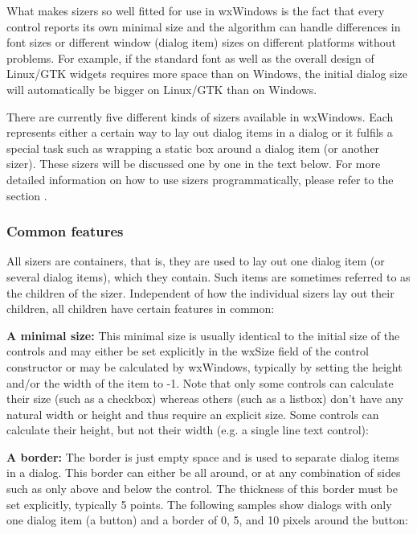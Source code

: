 What makes sizers so well fitted for use in wxWindows is the fact that every control
reports its own minimal size and the algorithm can handle differences in font sizes
or different window (dialog item) sizes on different platforms without problems. For example, if
the standard font as well as the overall design of Linux/GTK widgets requires more space than
on Windows, the initial dialog size will automatically be bigger on Linux/GTK than on Windows.

There are currently five different kinds of sizers available in wxWindows. Each represents
either a certain way to lay out dialog items in a dialog or it fulfils a special task
such as wrapping a static box around a dialog item (or another sizer). These sizers will
be discussed one by one in the text below. For more detailed information on how to use sizers
programmatically, please refer to the section .

\subsubsection{Common features}\label{sizerscommonfeatures}

All sizers are containers, that is, they are used to lay out one dialog item (or several
dialog items), which they contain. Such items are sometimes referred to as the children
of the sizer. Independent of how the individual sizers lay out their children, all children
have certain features in common:

{\bf A minimal size:} This minimal size is usually identical to
the initial size of the controls and may either be set explicitly in the wxSize field
of the control constructor or may be calculated by wxWindows, typically by setting
the height and/or the width of the item to -1. Note that only some controls can
calculate their size (such as a checkbox) whereas others (such as a listbox)
don't have any natural width or height and thus require an explicit size. Some controls
can calculate their height, but not their width (e.g. a single line text control):


{\bf A border:} The border is just empty space and is used to separate dialog items
in a dialog. This border can either be all around, or at any combination of sides
such as only above and below the control. The thickness of this border must be set
explicitly, typically 5 points. The following samples show dialogs with only one
dialog item (a button) and a border of 0, 5, and 10 pixels around the button:

